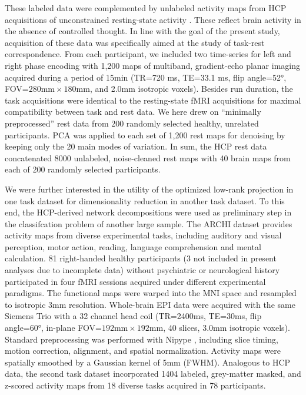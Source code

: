 \documentclass{article} %
\begin{document}
These labeled data were complemented by unlabeled activity maps
from HCP acquisitions of unconstrained resting-state activity
\cite{smith2013resting}.
These reflect brain activity in the absence of controlled thought.
In line with the goal of the present study, acquisition of these data was
specifically aimed at the study of task-rest correspondence.
From each participant, we included two
time-series for left and right phase encoding
with 1,200 maps of multiband, gradient-echo planar imaging acquired
during a period of 15min (TR=720 ms, TE=33.1 ms, flip angle=52°,
FOV=$280\textrm{mm}\times180\textrm{mm}$, and 2.0mm isotropic voxels). 
Besides run duration,
the task acquisitions were identical to the resting-state fMRI acquisitions
for maximal compatibility between task and rest data.
We here drew on ``minimally preprocessed'' rest data
from 200 randomly selected healthy, unrelated participants.
PCA was applied to each set of 1,200 rest maps for
denoising by keeping only the 20 main modes of
variation.
In sum, the HCP rest data concatenated
8000 unlabeled, noise-cleaned rest maps with
40 brain maps from each of 200 randomly selected participants.

We were further interested in the utility of the
optimized low-rank projection
in one task dataset for dimensionality reduction in another task dataset.
To this end, the HCP-derived network decompositions were used as preliminary
step in the classifcation problem of another large sample.
The ARCHI dataset \cite{pinel07} provides activity maps from
diverse experimental tasks, including auditory and visual perception, motor action,
reading, language comprehension and mental calculation.
81 right-handed healthy participants
(3 not included in present analyses due to incomplete data)
without psychiatric or
neurological history participated in four fMRI sessions acquired under
different experimental paradigms.
The functional maps were warped into
the MNI space and resampled to isotropic 3mm resolution.
Whole-brain EPI data were acquired with the same Siemens Trio with a 32
channel head coil (TR=2400ms, TE=30ms, flip angle=60°, in-plane
FOV=$192\textrm{mm}\times192\textrm{mm}$, 40 slices, 3.0mm isotropic voxels).
Standard preprocessing was performed with Nipype \cite{gorgo11}, including
slice timing, motion correction, alignment, and spatial normalization.
Activity maps were spatially smoothed by
a Gaussian kernel of 5mm (FWHM).
Analogous to HCP data, the second task dataset incorporated 1404
labeled, grey-matter masked, and z-scored activity maps
from 18 diverse tasks acquired in 78 participants.
\end{document}
